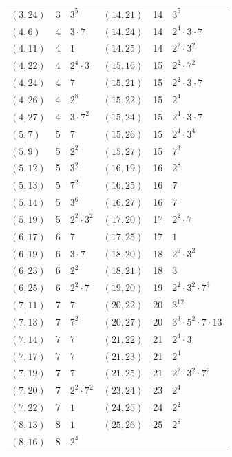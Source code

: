 \documentclass[11pt]{article}
\begin{document}
\begin{longtable}{@{}lrl@{\qquad}lrl@{}}
$(3,24)$ & 3 & $3^{5}$ & $(14,21)$ & 14 & $3^{5}$\\
$(4,6)$ & 4 & $3\cdot 7$ & $(14,24)$ & 14 & $2^{4}\cdot 3\cdot 7$\\
$(4,11)$ & 4 & $1$ & $(14,25)$ & 14 & $2^{2}\cdot 3^{2}$\\
$(4,22)$ & 4 & $2^{4}\cdot 3$ & $(15,16)$ & 15 & $2^{2}\cdot 7^{2}$\\
$(4,24)$ & 4 & $7$ & $(15,21)$ & 15 & $2^{2}\cdot 3\cdot 7$\\
$(4,26)$ & 4 & $2^{8}$ & $(15,22)$ & 15 & $2^{4}$\\
$(4,27)$ & 4 & $3\cdot 7^{2}$ & $(15,24)$ & 15 & $2^{4}\cdot 3\cdot 7$\\
$(5,7)$ & 5 & $7$ & $(15,26)$ & 15 & $2^{4}\cdot 3^{4}$\\
$(5,9)$ & 5 & $2^{2}$ & $(15,27)$ & 15 & $7^{3}$\\
$(5,12)$ & 5 & $3^{2}$ & $(16,19)$ & 16 & $2^{8}$\\
$(5,13)$ & 5 & $7^{2}$ & $(16,25)$ & 16 & $7$\\
$(5,14)$ & 5 & $3^{6}$ & $(16,27)$ & 16 & $7$\\
$(5,19)$ & 5 & $2^{2}\cdot 3^{2}$ & $(17,20)$ & 17 & $2^{2}\cdot 7$\\
$(6,17)$ & 6 & $7$ & $(17,25)$ & 17 & $1$\\
$(6,19)$ & 6 & $3\cdot 7$ & $(18,20)$ & 18 & $2^{6}\cdot 3^{2}$\\
$(6,23)$ & 6 & $2^{2}$ & $(18,21)$ & 18 & $3$\\
$(6,25)$ & 6 & $2^{2}\cdot 7$ & $(19,20)$ & 19 & $2^{2}\cdot 3^{2}\cdot 7^{3}$\\
$(7,11)$ & 7 & $7$ & $(20,22)$ & 20 & $3^{12}$\\
$(7,13)$ & 7 & $7^{2}$ & $(20,27)$ & 20 & $3^{3}\cdot 5^{2}\cdot 7\cdot 13$\\
$(7,14)$ & 7 & $7$ & $(21,22)$ & 21 & $2^{4}\cdot 3$\\
$(7,17)$ & 7 & $7$ & $(21,23)$ & 21 & $2^{4}$\\
$(7,19)$ & 7 & $7$ & $(21,25)$ & 21 & $2^{2}\cdot 3^{2}\cdot 7^{2}$\\
$(7,20)$ & 7 & $2^{2}\cdot 7^{2}$ & $(23,24)$ & 23 & $2^{4}$\\
$(7,22)$ & 7 & $1$ & $(24,25)$ & 24 & $2^{2}$\\
$(8,13)$ & 8 & $1$ & $(25,26)$ & 25 & $2^{8}$\\
$(8,16)$ & 8 & $2^{4}$ & & &\\
\end{longtable}
\endgroup
\end{document}
